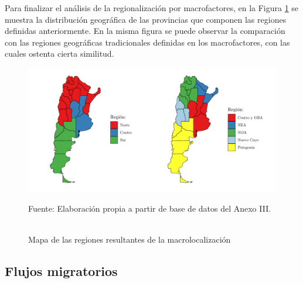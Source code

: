 \documentclass[12pt,a4paper]{article}
\begin{document}
Para finalizar el análisis de la regionalización por macrofactores, en la Figura \ref{figure:mapa_reg} se muestra la distribución geográfica de las provincias que componen las regiones definidas anteriormente. En la misma figura se puede observar la comparación con las regiones geográficas tradicionales definidas en los macrofactores, con las cuales ostenta cierta similitud.
\begin{figure}[ht!]
\begin{center}
\caption{\\Mapa de las regiones resultantes de la macrolocalización}
\includegraphics[scale=0.7]{./graficos/mapa_regiones.pdf}
\label{figure:mapa_reg}
\end{center}
\begin{flushleft}
\begin{scriptsize}
Fuente: Elaboración propia a partir de base de datos del Anexo III.\\
\end{scriptsize}
\end{flushleft}
\end{figure}

\subsection{Flujos migratorios}
\end{document}
